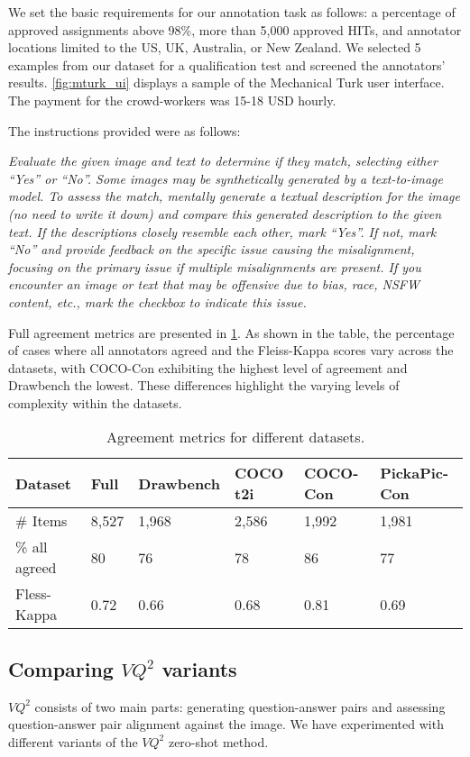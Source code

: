 \documentclass{article}
\begin{document}
We set the basic requirements for our annotation task as follows: a percentage of approved assignments above 98\%, more than 5,000 approved HITs, and annotator locations limited to the US, UK, Australia, or New Zealand. We selected 5 examples from our dataset for a qualification test and screened the annotators' results.
\cref{fig:mturk_ui} displays a sample of the Mechanical Turk user interface. The payment for the crowd-workers was 15-18 USD hourly. 

The instructions provided were as follows:

\textit{Evaluate the given image and text to determine if they match, selecting either “Yes” or “No”. Some images may be synthetically generated by a text-to-image model. To assess the match, mentally generate a textual description for the image (no need to write it down) and compare this generated description to the given text. If the descriptions closely resemble each other, mark “Yes”. If not, mark “No” and provide feedback on the specific issue causing the misalignment, focusing on the primary issue if multiple misalignments are present. If you encounter an image or text that may be offensive due to bias, race, NSFW content, etc., mark the checkbox to indicate this issue.}

Full agreement metrics are presented in \cref{tab:agreement}. As shown in the table, the percentage of cases where all annotators agreed and the Fleiss-Kappa scores vary across the datasets, with COCO-Con exhibiting the highest level of agreement and Drawbench the lowest. These differences highlight the varying levels of complexity within the datasets.

\begin{table}[!h]
\centering
\caption{Agreement metrics for different datasets.}
\label{tab:agreement}
\begin{tabular}{@{}llllll@{}}
\toprule
Dataset       & Full  & Drawbench & COCO t2i & COCO-Con & PickaPic-Con \\ \midrule
\# Items      & 8,527 & 1,968     & 2,586    & 1,992    & 1,981        \\
\% all agreed & 80    & 76        & 78       & 86       & 77           \\
Fless-Kappa   & 0.72  & 0.66      & 0.68     & 0.81     & 0.69         \\ \bottomrule
\end{tabular}
\end{table}

\subsection{\texorpdfstring{Comparing $VQ^2$ variants}{Comparing VQ2 variants}}
\label{sec:vq2_ablations}
$VQ^2$ consists of two main parts: generating question-answer pairs and assessing question-answer pair alignment against the image. We have experimented with different variants of the $VQ^2$ zero-shot method.
\end{document}

